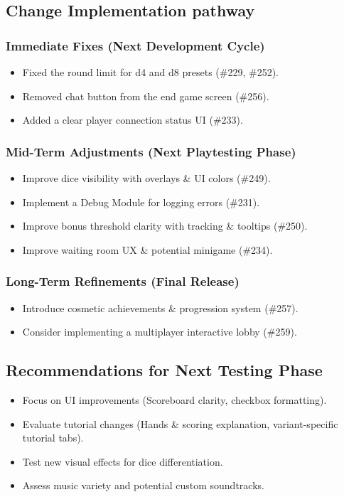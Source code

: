 \documentclass[12pt, titlepage]{article}
\begin{document}
\subsection{Change Implementation pathway}

\subsubsection{Immediate Fixes (Next Development Cycle)}
\begin{itemize}
    \item Fixed the round limit for d4 and d8 presets (\#229, \#252).
    \item Removed chat button from the end game screen (\#256).
    \item Added a clear player connection status UI (\#233).
\end{itemize}

\subsubsection{Mid-Term Adjustments (Next Playtesting Phase)}
\begin{itemize}
    \item Improve dice visibility with overlays \& UI colors (\#249).
    \item Implement a Debug Module for logging errors (\#231).
    \item Improve bonus threshold clarity with tracking \& tooltips (\#250).
    \item Improve waiting room UX \& potential minigame (\#234).
\end{itemize}

\subsubsection{Long-Term Refinements (Final Release)}
\begin{itemize}
    \item Introduce cosmetic achievements \& progression system (\#257).
    \item Consider implementing a multiplayer interactive lobby (\#259).
\end{itemize}

\subsection{Recommendations for Next Testing Phase}
\begin{itemize}
    \item Focus on UI improvements (Scoreboard clarity, checkbox formatting).
    \item Evaluate tutorial changes (Hands \& scoring explanation, variant-specific tutorial tabs).
    \item Test new visual effects for dice differentiation.
    \item Assess music variety and potential custom soundtracks.
\end{itemize}
\end{document}
